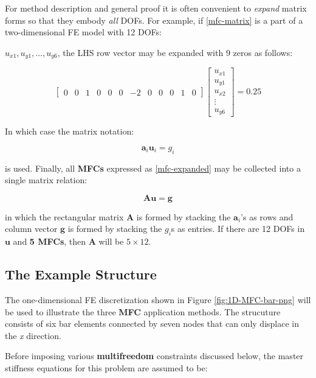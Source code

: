 \documentclass[10pt,b5paper,titlepage]{book}
\newcommand{\m}{\mathbf}
\begin{document}
For method description and general proof it is often convenient to \textit{expand}
matrix forms so that they embody \textit{all} DOFs. For example, if
\eqref{mfc-matrix} is a part of a two-dimensional FE model with 12 DOFs:

$ u_{x1}, u_{y1}, \dots, u_{y6} $, the LHS row vector may be expanded with
9 zeros as follows:

\begin{equation}
    \begin{bmatrix}
        0 & 0 & 1 & 0 & 0 & 0 & -2 & 0 & 0 & 0 & 1 & 0
    \end{bmatrix}
    \begin{bmatrix}
        u_{x1} \\
        u_{y1} \\
        u_{x2} \\
        \vdots \\
        u_{y6}
    \end{bmatrix}
    = 0.25
\end{equation}

In which case the matrix notation:

\begin{equation}\label{mfc-expanded}
    \m{a}_i \m{u}_i = g_i
\end{equation}

is used. Finally, all \textbf{MFCs} expressed as \eqref{mfc-expanded} may be collected
into a single matrix relation:

\begin{equation}\label{mfc-expanded-matrix}
    \m{A} \m{u} = \m{g}
\end{equation}

in which the rectangular matrix $ \m{A} $ is formed by stacking the
$ \m{a}_i $'s as rows and column vector $ \m{g} $ is formed by stacking
the $ g_i $s as entries. If there are 12 DOFs in $ \m{u} $ and \textbf{5 MFCs},
then $ \m{A} $ will be $ 5 \times 12 $.


\subsection{The Example Structure}

The one-dimensional FE discretization shown in Figure \ref{fig:1D-MFC-bar-png}
will be used to illustrate the three \textbf{MFC} application methods. The
strucuture consists of six bar elements connected by seven nodes that can only
displace in the \textit{x} direction.

Before imposing various \textbf{multifreedom} constraints discussed below, the master
stiffness equations for this problem are assumed to be:
\end{document}
